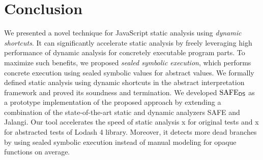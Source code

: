 \section{Conclusion}\label{sec:conclusion}
We presented a novel technique for JavaScript static analysis using \textit{dynamic shortcuts}.
It can significantly accelerate static
analysis by freely leveraging high performance of dynamic analysis for
concretely executable program parts.  To maximize such benefits,
we proposed \textit{sealed symbolic execution}, which performs
concrete execution using sealed symbolic values for abstract values.
We formally defined static analysis using dynamic shortcuts in the
abstract interpretation framework and proved its soundness and termination.
We developed $\text{SAFE}_{\textsf{DS}}$ as a prototype implementation of the proposed approach
by extending a combination of the state-of-the-art static and dynamic
analyzers SAFE and Jalangi.  Our tool accelerates the speed
of static analysis x for original tests and x for
abstracted tests of Lodash 4 library.  Moreover, it detects  more
dead branches by using sealed symbolic execution instead of
manual modeling for  opaque functions on average.
